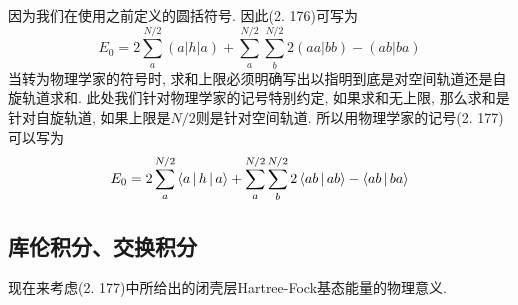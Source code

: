 因为我们在使用之前定义的圆括符号. 
因此(2.
176)可写为
\begin{equation}
E_0 = 2 \sum_{a}^{N/2}({a|h|a}) + \sum_{a}^{N/2}\sum_{b}^{N/2}2({aa|bb}) - ({ab|ba})
\end{equation}
当转为物理学家的符号时, 
求和上限必须明确写出以指明到底是对空间轨道还是自旋轨道求和. 
此处我们针对物理学家的记号特别约定, 
如果求和无上限, 
那么求和是针对自旋轨道, 
如果上限是$N/2$则是针对空间轨道. 
所以用物理学家的记号(2.
177)可以写为
\begin{equation}
E_0 = 2 \sum_{a}^{N/2}\Braket{a|h|a} + \sum_{a}^{N/2}\sum_{b}^{N/2}2\Braket{ab|ab} - \Braket{ab|ba}
\end{equation}
\subsection{库伦积分、交换积分}
\label{sec2.3.6}
现在来考虑(2.
177)中所给出的闭壳层Hartree-Fock基态能量的物理意义.

